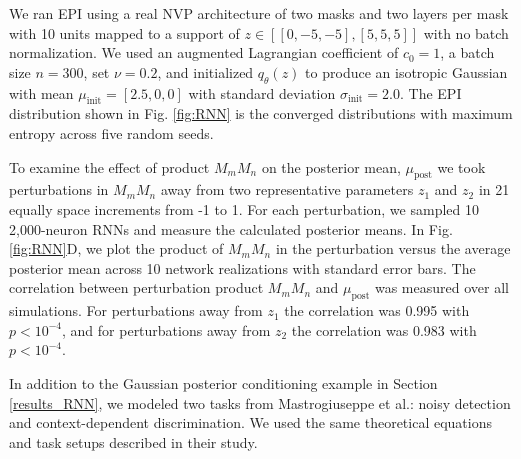 \documentclass[11pt]{article}
\begin{document}
We ran EPI using a real NVP architecture of two masks and two layers per mask with 10 units mapped to a support of $z \in \left[[0, -5, -5], [5, 5, 5] \right]$ with no batch normalization. 
We used an augmented Lagrangian coefficient of $c_0 = 1$, a batch size $n=300$, set $\nu = 0.2$, and initialized $q_\theta(z)$ to produce an isotropic Gaussian with mean $\mu_{\text{init}} = [2.5, 0, 0]$ with standard deviation $\sigma_{\text{init}} = 2.0$.
 The EPI distribution shown in Fig. \ref{fig:RNN} is the converged distributions with maximum entropy across five random seeds.

To examine the effect of product $M_m M_n$ on the posterior mean, $\mu_{\text{post}}$ we took perturbations in $M_m M_n$ away from two representative parameters  $z_1$ and $z_2$ in 21 equally space increments from -1 to 1.  For each perturbation, we sampled 10 2,000-neuron RNNs and measure the calculated posterior means.  In Fig. \ref{fig:RNN}D, we plot the product of $M_m M_n$ in the perturbation versus the average posterior mean across 10 network realizations with standard error bars.  The correlation between perturbation product $M_m M_n$ and $\mu_{\text{post}}$ was measured over all simulations.  For perturbations away from $z_1$ the correlation was 0.995 with $p<10^{-4}$, and for perturbations away from $z_2$ the correlation was 0.983 with $p<10^{-4}$.

In addition to the Gaussian posterior conditioning example in Section \ref{results_RNN}, we modeled two tasks from Mastrogiuseppe et al.: noisy detection and context-dependent discrimination.  We used the same theoretical equations and task setups described in their study.


\end{document}
